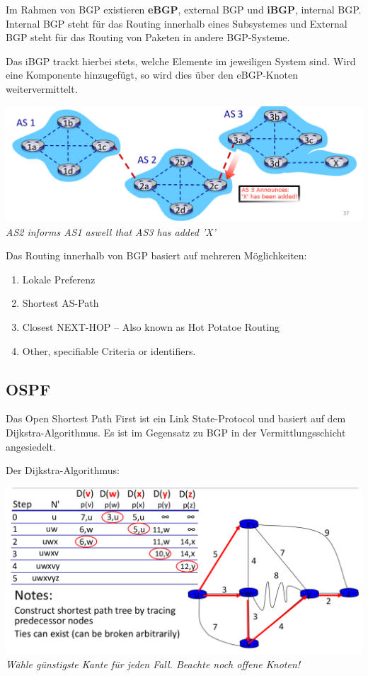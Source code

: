 \documentclass{scrartcl}
\begin{document}
    Im Rahmen von BGP existieren \textbf{eBGP}, external BGP und \textbf{iBGP}, internal BGP. Internal BGP steht für das Routing innerhalb eines Subsystemes und External BGP steht für das Routing von Paketen in andere BGP-Systeme.
    
    Das iBGP trackt hierbei stets, welche Elemente im jeweiligen System sind. Wird eine Komponente hinzugefügt, so wird dies über den eBGP-Knoten weitervermittelt.
    
    \begin{center}
        \includegraphics[width=\textwidth]{BGP.png}
        \textit{AS2 informs AS1 aswell that AS3 has added 'X'}
    \end{center}
    
    Das Routing innerhalb von BGP basiert auf mehreren Möglichkeiten:
    \begin{enumerate}
        \item Lokale Preferenz
        \item Shortest AS-Path
        \item Closest NEXT-HOP -- Also known as Hot Potatoe Routing
        \item Other, specifiable Criteria or identifiers.
    \end{enumerate}
    
    
    \subsection{OSPF}
    Das Open Shortest Path First ist ein Link State-Protocol und basiert auf dem Dijkstra-Algorithmus. Es ist im Gegensatz zu BGP in der Vermittlungsschicht angesiedelt.
    
    Der Dijkstra-Algorithmus:
    \begin{center}
        \includegraphics[width=\textwidth]{Dijkstra.png}\\
        \textit{Wähle günstigste Kante für jeden Fall. Beachte noch offene Knoten!}
    \end{center}
    
\end{document}
